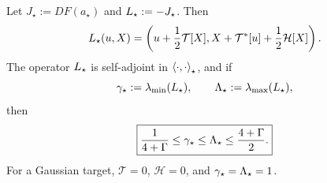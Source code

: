 \begin{proposition}
\label{prop:linearized}
Let $J_\star:=DF(a_\star)$ and $L_\star:=-J_\star$.  Then
\begin{equation}
\label{eq:Lstar-formula}
    L_\star(u,X)
    =\left(
        u+\frac12\mathcal T[X],
        X+\mathcal T^*[u]+\frac12\mathcal H[X]
    \right).
\end{equation}
The operator $L_\star$ is self-adjoint in $\left\langle \cdot,\cdot\right\rangle_\star$, and if
\[
    \gamma_\star:=\lambda_{\min}(L_\star),
    \qquad
    \Lambda_\star:=\lambda_{\max}(L_\star),
\]
then
\begin{equation}
\label{eq:linear-gap-bounds}
    \boxed{
    \frac1{4+\Gamma}\leq\gamma_\star\leq\Lambda_\star\leq\frac{4+\Gamma}{2}.
    }
\end{equation}
For a Gaussian target, $\mathcal T=0$, $\mathcal H=0$, and
$\gamma_\star=\Lambda_\star=1$.
\end{proposition}

